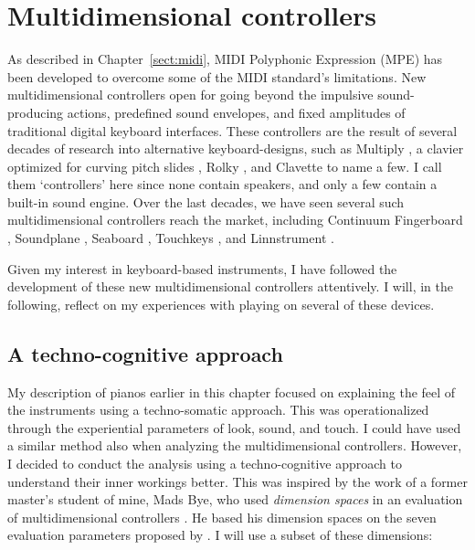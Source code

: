 \section{Multidimensional controllers}\label{sec:mpe-instruments}

As described in Chapter~\ref{sect:midi}, MIDI Polyphonic Expression (MPE) has been developed to overcome some of the MIDI standard's limitations. New multidimensional controllers open for going beyond the impulsive sound-producing actions, predefined sound envelopes, and fixed amplitudes of traditional digital keyboard interfaces. These controllers are the result of several decades of research into alternative keyboard-designs, such as Multiply \citep{moog_multiply_1982}, a clavier optimized for curving pitch slides \citep{snell_sensors_1983}, Rolky \citep{johnstone_rolky_1985}, and Clavette \citep{fortuin_clavette_1995} to name a few. I call them `controllers' here since none contain speakers, and only a few contain a built-in sound engine. Over the last decades, we have seen several such multidimensional controllers reach the market, including
Continuum Fingerboard \citep{haken_indiscrete_1998},
Soundplane \citep{jones_force-sensitive_2009},
Seaboard \citep{lamb_seaboard_2011},
Touchkeys \citep{mcpherson_touchkeys_2012},
and Linnstrument \citep{linn_linnstrument_2013}.

Given my interest in keyboard-based instruments, I have followed the development of these new multidimensional controllers attentively. I will, in the following, reflect on my experiences with playing on several of these devices.


\subsection{A techno-cognitive approach}

My description of pianos earlier in this chapter focused on explaining the feel of the instruments using a techno-somatic approach. This was operationalized through the experiential parameters of look, sound, and touch. I could have used a similar method also when analyzing the multidimensional controllers. However, I decided to conduct the analysis using a techno-cognitive approach to understand their inner workings better. This was inspired by the work of a former master's student of mine, Mads Bye, who used \emph{dimension spaces} in an evaluation of multidimensional controllers \citep{bye_midi_2018}. He based his dimension spaces on the seven evaluation parameters proposed by \citet{birnbaum_towards_2005}. I will use a subset of these dimensions:

